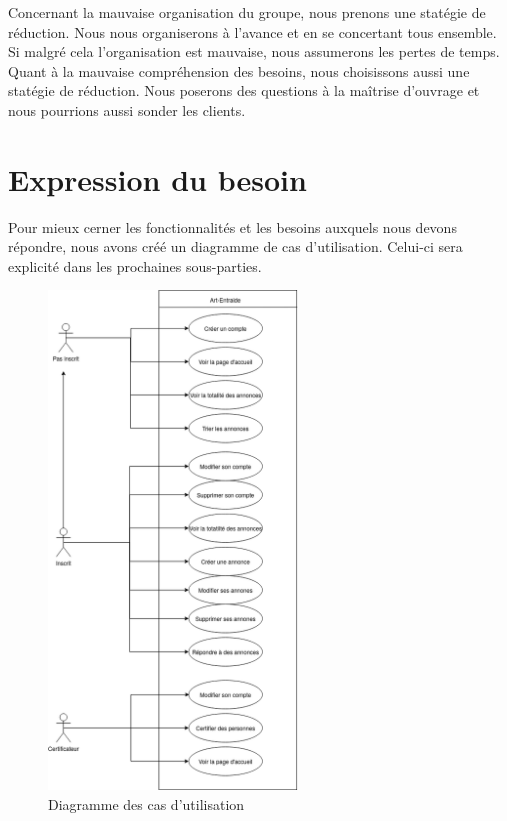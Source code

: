 \documentclass[a4paper,11pt]{article}
\begin{document}
Concernant la mauvaise organisation du groupe, nous prenons une statégie de réduction. Nous nous organiserons
à l'avance et en se concertant tous ensemble. Si malgré cela l'organisation est mauvaise, nous
assumerons les pertes de temps. Quant à la mauvaise compréhension des besoins, nous choisissons
aussi une statégie de réduction. Nous poserons des questions à la maîtrise d'ouvrage et nous pourrions aussi sonder
les clients.\\

\newpage


\section{Expression du besoin}

Pour mieux cerner les fonctionnalités et les besoins auxquels nous devons répondre, nous avons créé un diagramme de cas d'utilisation.
Celui-ci sera explicité dans les prochaines sous-parties.

\begin{figure}[H]
  \includegraphics[width=250px]{../Conception/DCU.png}
  \caption{Diagramme des cas d'utilisation}
  \label{fig:DCU}
\end{figure}
\end{document}
